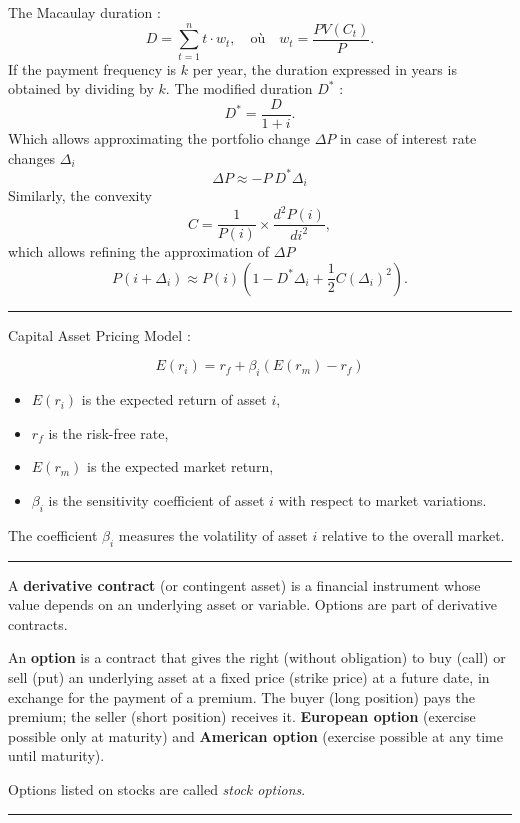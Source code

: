 \begin{f}

The Macaulay duration :
\[ 		
D = \sum_{t=1}^{n} t \cdot w_t, \quad \text{où} \quad w_t = \frac{PV(C_t)}{P}.
 \]	
If the payment frequency is \(k\) per year, the duration expressed in years is obtained by dividing by \(k\).
The modified duration \(D^*\) :
\[ 	
D^* = \frac{D}{1 + i}.
 \]
Which allows approximating the portfolio change \(\Delta P\) in case of interest rate changes \(\Delta_i\)
\[ 
\Delta P \approx -P\ D^* \Delta_i 
 \]
Similarly, the convexity
\[ 	
C = \frac{1}{P(i)} \times \frac{d^2 P(i)}{di^2},
 \]
which allows refining the approximation of \(\Delta P\)
\[ 	
P(i + \Delta_i) \approx P(i) \left( 1 -D^*\Delta_i + \frac{1}{2} C (\Delta_i)^2 \right).
 \]
\end{f}
\hrule



\begin{f}[CAPM]
  Capital Asset Pricing Model :

\[
E(r_i) = r_f + \beta_i (E(r_m) - r_f)
\]

\begin{itemize}
    \item \( E(r_i) \) is the expected return of asset \( i \),
    \item \( r_f \) is the risk-free rate,
    \item \( E(r_m) \) is the expected market return,
    \item \( \beta_i \) is the sensitivity coefficient of asset \( i \) with respect to market variations.
\end{itemize}

The coefficient \( \beta_i \) measures the volatility of asset \( i \) relative to the overall market.

\end{f}
\hrule


\begin{f}

A \textbf{derivative contract} (or contingent asset) is a financial instrument whose value depends on an underlying asset or variable. Options are part of derivative contracts.


An \textbf{option} is a contract that gives the right (without obligation) to buy (call) or sell (put) an underlying asset at a fixed price (strike price) at a future date, in exchange for the payment of a premium.
The buyer (long position) pays the premium; the seller (short position) receives it. \textbf{European option} (exercise possible only at maturity) and  
 \textbf{American option} (exercise possible at any time until maturity).

Options listed on stocks are called \textit{stock options}.

\end{f}
\hrule


